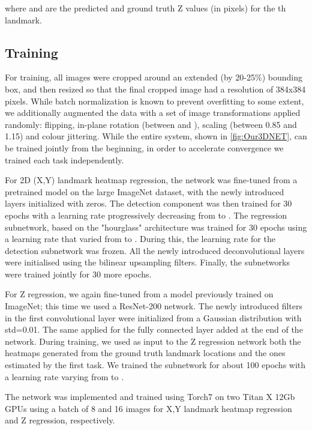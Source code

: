 \documentclass[runningheads]{llncs}
\begin{document}
where  and  are the predicted and  ground truth Z values (in pixels) for the th landmark.



\subsection{Training}\label{ssec:methodtrain}
For training, all images were cropped around an extended (by 20-25\%) bounding box, and then resized so that the final cropped image had a resolution of 384x384 pixels. While batch normalization is known to prevent overfitting to some extent, we additionally augmented the data with a set of image transformations applied randomly: flipping, in-plane rotation (between  and ), scaling (between 0.85 and 1.15) and colour jittering. While the entire system, shown in \figurename{\ref{fig:Our3DNET}}, can be trained jointly from the beginning, in order to accelerate convergence we trained each task independently.  

For 2D (X,Y) landmark heatmap regression, the network was fine-tuned from a pretrained model on the large ImageNet \cite{deng2009imagenet} dataset, with the newly introduced layers initialized with zeros. The detection component was then trained for 30 epochs with a learning rate progressively decreasing from  to . The regression subnetwork, based on the "hourglass" architecture was trained for 30 epochs using a learning rate that varied from  to . During this, the learning rate for the detection subnetwork was frozen.  All the newly introduced deconvolutional layers were initialised using the bilinear upsampling filters. Finally, the subnetworks were trained jointly for 30 more epochs.

For Z regression, we again fine-tuned from a model previously trained on ImageNet\cite{deng2009imagenet}; this time we used a ResNet-200 network\cite{he2016identity}. The newly introduced filters in the first convolutional layer were initialized from a Gaussian distribution with std=0.01. The same applied for the fully connected layer added at the end of the network. During training, we used as input to the Z regression network both the heatmaps generated from the ground truth landmark locations and the ones estimated by the first task. We trained the subnetwork for about 100 epochs with a learning rate varying from  to . 

The network was implemented and trained using Torch7 \cite{collobert2011torch7} on two Titan X 12Gb GPUs using a batch of 8 and 16 images for X,Y landmark heatmap regression and Z regression, respectively.
\end{document}
